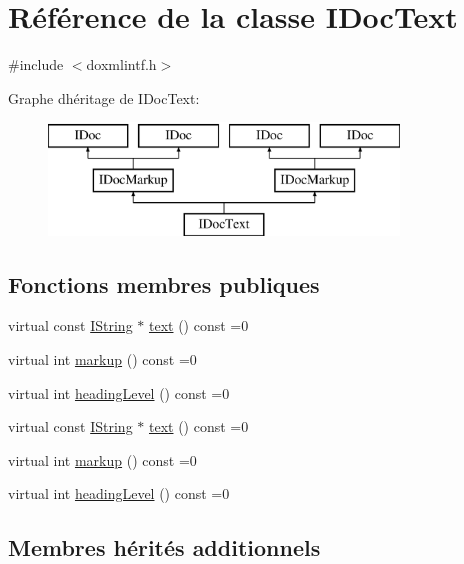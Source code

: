 \hypertarget{class_i_doc_text}{}\section{Référence de la classe I\+Doc\+Text}
\label{class_i_doc_text}


{\ttfamily \#include $<$doxmlintf.\+h$>$}

Graphe d\textquotesingle{}héritage de I\+Doc\+Text\+:\begin{figure}[H]
\begin{center}
\leavevmode
\includegraphics[height=3.000000cm]{class_i_doc_text}
\end{center}
\end{figure}
\subsection*{Fonctions membres publiques}
\begin{DoxyCompactItemize}
\item 
virtual const \hyperlink{class_i_string}{I\+String} $\ast$ \hyperlink{class_i_doc_text_a487e996792bc161790fb71e3fb0e260c}{text} () const  =0
\item 
virtual int \hyperlink{class_i_doc_text_ac402d8fb37ed58ef46a158c327e44827}{markup} () const  =0
\item 
virtual int \hyperlink{class_i_doc_text_a995109eee0b7b45fd6edf7d678a48f71}{heading\+Level} () const  =0
\item 
virtual const \hyperlink{class_i_string}{I\+String} $\ast$ \hyperlink{class_i_doc_text_a487e996792bc161790fb71e3fb0e260c}{text} () const  =0
\item 
virtual int \hyperlink{class_i_doc_text_ac402d8fb37ed58ef46a158c327e44827}{markup} () const  =0
\item 
virtual int \hyperlink{class_i_doc_text_a995109eee0b7b45fd6edf7d678a48f71}{heading\+Level} () const  =0
\end{DoxyCompactItemize}
\subsection*{Membres hérités additionnels}


